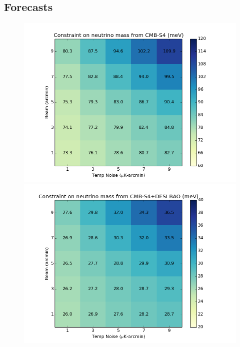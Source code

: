 \subsection{Forecasts}\label{sec:nuforecasts}



\begin{figure}[h!]
\begin{center}
\includegraphics[scale=0.4]{Neutrinos/S4_BeamVsNoise.png}
\includegraphics[scale=0.4]{Neutrinos/S4+DESI_BeamVsNoise.png}  

\end{center}
\end{figure}
